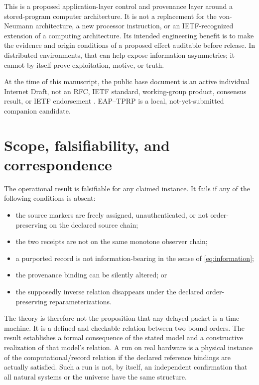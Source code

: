 \documentclass[11pt]{article}
\theoremstyle{remark}
\begin{document}
This is a proposed application-layer control and provenance layer around a
stored-program computer architecture. It is not a replacement for the
von-Neumann architecture, a new processor instruction, or an IETF-recognized
extension of a computing architecture. Its intended engineering benefit is
to make the evidence and origin conditions of a proposed effect auditable
before release. In distributed environments, that can help expose
information asymmetries; it cannot by itself prove exploitation, motive, or
truth.

At the time of this manuscript, the public base document
 is an active individual Internet
Draft, not an RFC, IETF standard, working-group product, consensus result, or
IETF endorsement \cite{LohmannEAP2026}. EAP--TPRP is a local,
not-yet-submitted companion candidate.

\section{Scope, falsifiability, and correspondence}
\label{sec:scope}

The operational result is falsifiable for any claimed instance. It fails if
any of the following conditions is absent:
\begin{itemize}
  \item the source markers are freely assigned, unauthenticated, or not
  order-preserving on the declared source chain;
  \item the two receipts are not on the same monotone observer chain;
  \item a purported record is not information-bearing in the sense of
  \cref{eq:information};
  \item the provenance binding can be silently altered; or
  \item the supposedly inverse relation disappears under the declared
  order-preserving reparameterizations.
\end{itemize}

The theory is therefore not the proposition that any delayed packet is a
time machine. It is a defined and checkable relation between two bound
orders. The result establishes a formal consequence of the stated model and
a constructive realization of that model's relation. A run on real hardware
is a physical instance of the computational/record relation if the declared
reference bindings are actually satisfied. Such a run is not, by itself, an
independent confirmation that all natural systems or the universe have the
same structure.
\end{document}

